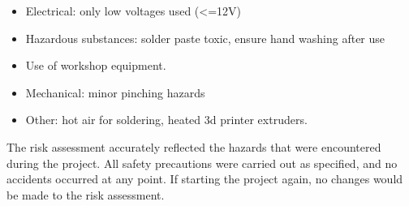 \begin{itemize}\itemsep0em
\item
Electrical: only low voltages used (<=12V)

\item
Hazardous substances: solder paste toxic, ensure hand washing after use

\item
Use of workshop equipment.

\item
Mechanical: minor pinching hazards

\item
Other: hot air for soldering, heated 3d printer extruders.

\end{itemize}

The risk assessment accurately reflected the hazards that were encountered
during the project. All safety precautions were carried out as specified,
and no accidents occurred at any point. If starting the project again, no
changes would be made to the risk assessment.

\newpage

\printglossaries

\nocite{*}
\printbibliography


